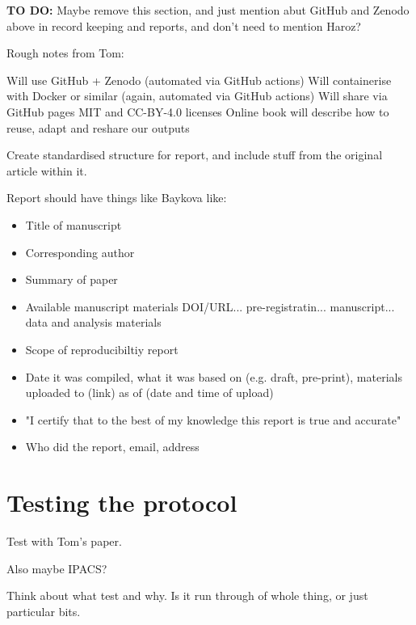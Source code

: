 \textbf{TO DO:} Maybe remove this section, and just mention abut GitHub and Zenodo above in record keeping and reports, and don't need to mention Haroz?

Rough notes from Tom:

Will use GitHub + Zenodo (automated via GitHub actions)
Will containerise with Docker or similar (again, automated via GitHub actions)
Will share via GitHub pages
MIT and CC-BY-4.0 licenses
Online book will describe how to reuse, adapt and reshare our outputs

Create standardised structure for report, and include stuff from the original article within it.

Report should have things like Baykova \autocite{baykova_ensuring_2024} like:
\begin{itemize}
    \item Title of manuscript
    \item Corresponding author
    \item Summary of paper
    \item Available manuscript materials DOI/URL... pre-registratin... manuscript... data and analysis materials
    \item Scope of reproducibiltiy report
    \item Date it was compiled, what it was based on (e.g. draft, pre-print), materials uploaded to (link) as of (date and time of upload)
    \item "I certify that to the best of my knowledge this report is true and accurate"
    \item Who did the report, email, address
\end{itemize}

\section{Testing the protocol}

Test with Tom's paper.

Also maybe IPACS?

Think about what test and why. Is it run through of whole thing, or just particular bits.

